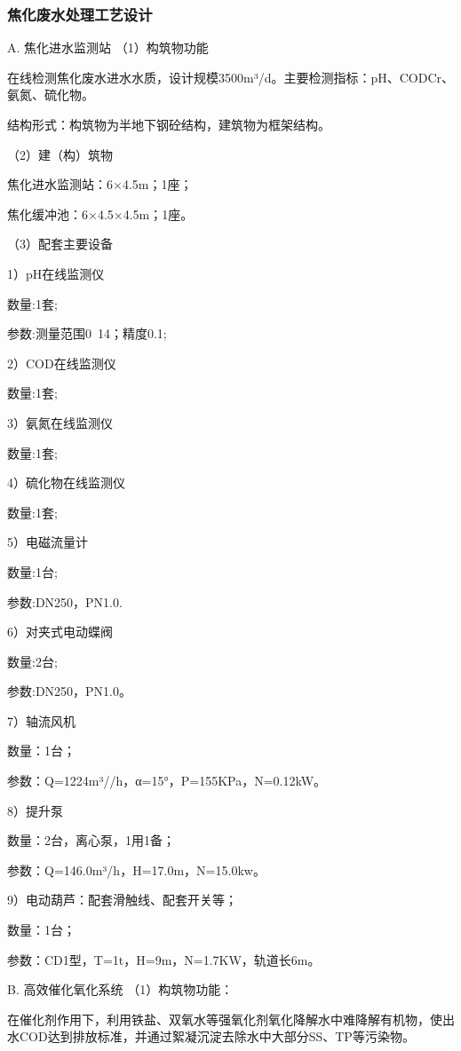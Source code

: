 \subsubsection{焦化废水处理工艺设计} 
A. 焦化进水监测站
（1）构筑物功能	\par 
在线检测焦化废水进水水质，设计规模3500m³/d。主要检测指标：pH、CODCr、氨氮、硫化物。\par 
结构形式：构筑物为半地下钢砼结构，建筑物为框架结构。\par 
（2）建（构）筑物				\par 
焦化进水监测站：6×4.5m；1座；	\par 
焦化缓冲池：6×4.5×4.5m；1座。	\par 
（3）配套主要设备				\par 
1）pH在线监测仪	\par 
数量:1套;\par 
参数:测量范围0~14；精度0.1;\par 
2）COD在线监测仪	\par 
数量:1套;\par 
3）氨氮在线监测仪	\par 
数量:1套;\par 
4）硫化物在线监测仪	\par 
数量:1套;\par 
5）电磁流量计	\par 
数量:1台;\par 
参数:DN250，PN1.0.\par 
6）对夹式电动蝶阀	\par 
数量:2台;\par 
参数:DN250，PN1.0。\par 
7）轴流风机	\par 
数量：1台；\par 
参数：Q=1224m³//h，α=15°，P=155KPa，N=0.12kW。\par 
8）提升泵	\par 
数量：2台，离心泵，1用1备；\par 
参数：Q=146.0m³/h，H=17.0m，N=15.0kw。\par 
9）电动葫芦：配套滑触线、配套开关等；\par 
数量：1台；\par 
参数：CD1型，T=1t，H=9m，N=1.7KW，轨道长6m。\par 
B. 高效催化氧化系统 
（1）构筑物功能：\par 
在催化剂作用下，利用铁盐、双氧水等强氧化剂氧化降解水中难降解有机物，使出水COD达到排放标准，并通过絮凝沉淀去除水中大部分SS、TP等污染物。\par 
